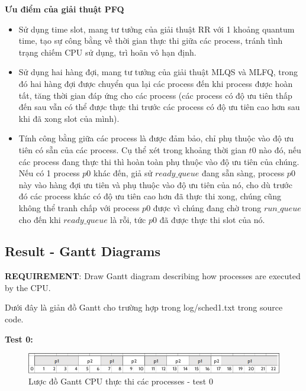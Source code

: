 \vspace{0.5cm}

\textbf{Ưu điểm của giải thuật PFQ}

\vspace{0.5cm}

\begin{itemize}
	\item Sử dụng time slot, mang tư tưởng của giải thuật RR với 1 khoảng quantum time, tạo sự công bằng về thời gian thực thi giữa các process, tránh tình trạng chiếm CPU sử dụng, trì hoãn vô hạn định.
	\item Sử dụng hai hàng đợi, mang tư tưởng của giải thuật MLQS và MLFQ, trong đó hai hàng đợi được chuyển qua lại các process đến khi process được hoàn tất, tăng thời gian đáp ứng cho các process (các process có độ ưu tiên thấp đến sau vẫn có thể được thực thi trước các process có độ ưu tiên cao hơn sau khi đã xong slot của mình).
	\item Tính công bằng giữa các process là được đảm bảo, chỉ phụ thuộc vào độ ưu tiên có sẵn của các process. Cụ thể xét trong khoảng thời gian $ t0 $ nào đó, nếu các process đang thực thi thì hoàn toàn phụ thuộc vào độ ưu tiên của chúng. Nếu có 1 process $ p0 $ khác đến, giả sử $ ready\_queue $ đang sẵn sàng, process $ p0 $ này vào hàng đợi ưu tiên và phụ thuộc vào độ ưu tiên của nó, cho dù trước đó các process khác có độ ưu tiên cao hơn đã thực thi xong, chúng cũng không thể tranh chấp với process $ p0 $ được vì chúng đang chờ trong  $ run\_queue $ cho đến khi $ ready\_queue $ là rỗi, tức $ p0 $ đã được thực thi slot của nó.
\end{itemize}

\vspace{0.5cm}

\subsection{Result - Gantt Diagrams}
\vspace{0.5cm}
\textbf{REQUIREMENT}: Draw Gantt diagram describing how processes are executed by the CPU.

\vspace{0.5cm}

Dưới đây là giản đồ Gantt cho trường hợp trong log/sched1.txt trong source code.

\textbf{Test 0:}

\vspace{0.5cm}

\begin{figure}[tph]
	\centering
	\includegraphics[width=13cm]{Images/sched0.png}
	\vspace{0.5cm}
	\caption{Lược đồ Gantt CPU thực thi các processes - test 0}
	\label{fig:schedtest0}
\end{figure}


